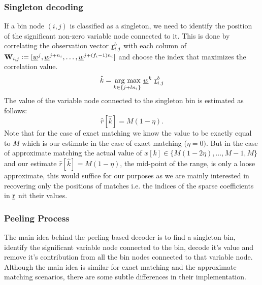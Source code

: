 \begin{enumerate}
\subsubsection{Singleton decoding}
 If a bin node $(i,j)$ is classified as a singleton, we need to identify the position of the significant non-zero variable node connected to it. This is done by correlating the observation vector $\underline{\mathrm{r}}^{b}_{i,j}$ with each column of  $\mathbf{W}_{i,j} \mathrel{\mathop:}= [\underline{w}^{j},\underline{w}^{j+n_i},\ldots,   \underline{w}^{j+(f_i-1)n_i}]$ and choose the index that maximizes the correlation value.
\begin{align*}
 \hat{k} = \underset{k\in\{j+l n_i\}}{\operatorname*{\,arg\ max}}\  \underline{w}^{k} ~ \underline{\mathrm{r}}^{b}_{i,j}
\end{align*}
 The value of the variable node connected to  the singleton bin  is estimated as follows:\\
 $$
 \hat{r}[\hat{k}]=M(1-\eta).
 $$
 Note that for the case of exact matching we know the value to be exactly equal to $M$ which is our estimate in the case of exact matching ($\eta=0)$. But in the case of approximate matching the actual value of $x[k]\in\{M(1-2\eta),\ldots,M-1,M\}$ and our estimate $ \hat{r}[\hat{k}]=M(1-\eta)$, the mid-point of the range, is only a loose approximate, this would suffice for our purposes as we are mainly interested in recovering only the positions of matches i.e. the indices of the sparse coefficients in $\underline{\mathrm{r}}$ nit their values. \\
			 

\subsubsection{Peeling Process} The main idea behind the peeling based decoder is to find a singleton bin, identify the significant variable node connected to the bin, decode it's value and remove it's contribution from all the bin nodes connected to that variable node. Although the main idea is similar for exact matching and the approximate matching scenarios, there are some subtle differences in their implementation.\\


\end{enumerate}
